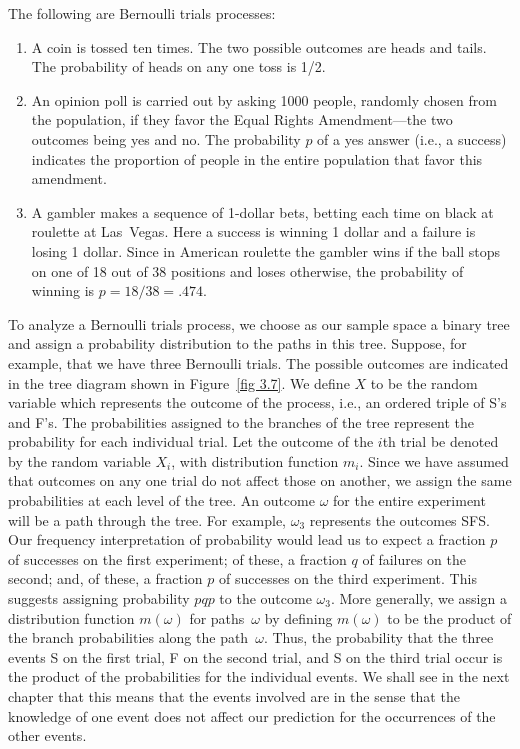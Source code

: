 
\begin{example}\label{exam 3.9} The following are Bernoulli trials processes:
\begin{enumerate}
\item A coin is tossed ten times.  The two possible outcomes are heads and tails.  The
probability of heads on any one toss is 1/2.
\item An opinion poll is carried out by asking 1000 people, randomly chosen from the
population, if they favor the Equal Rights Amendment---the two outcomes being yes and no.  The
probability $p$ of a yes answer (i.e., a success) indicates the proportion of people
in the entire population that favor this amendment.
\item A gambler makes a sequence of 1-dollar bets, betting each time on black at
roulette at Las~Vegas.  Here a success is winning 1 dollar and a failure is losing 1
dollar.  Since in American roulette the gambler wins if the ball stops on one of 18
out of 38 positions and loses otherwise, the probability of winning is $p = 18/38 =
.474$.
\end{enumerate}
\end{example}

To analyze a Bernoulli trials process, we choose as our sample space a binary tree and
assign a probability distribution to the paths in this tree.  Suppose, for example, that we
have three Bernoulli trials.  The possible outcomes are indicated in the tree diagram
shown in Figure~\ref{fig 3.7}.  We define $X$ to be the random variable which
represents the outcome of the process, i.e., an ordered triple of S's and F's. The
probabilities assigned to the branches of the tree represent the probability for each
individual trial.  Let the outcome of the $i$th trial be denoted by the random
variable
$X_i$, with distribution function $m_i$.  Since we have assumed that outcomes on any
one trial do not affect those on another, we assign the same probabilities at each
level of the tree.  An outcome
$\omega$ for the entire experiment will be a path through the tree.  For example,
$\omega_3$ represents the outcomes SFS.  Our frequency interpretation of probability
would lead us to expect a fraction $p$ of successes on the first experiment; of these,
a fraction $q$ of failures on the second; and, of these, a fraction $p$ of successes
on the third experiment.  This suggests assigning probability $pqp$ to the outcome
$\omega_3$.  More generally, we assign a distribution function $m(\omega)$ for
paths~$\omega$ by defining $m(\omega)$ to be the product of the branch probabilities
along the path~$\omega$.  Thus, the probability that the three events S on the first
trial, F on the second trial, and S on the third trial occur is the product of the
probabilities for the individual events.  We shall see in the next chapter that this
means that the events involved are  in the sense that the knowledge
of one event does not affect our prediction for the occurrences of the other events.

